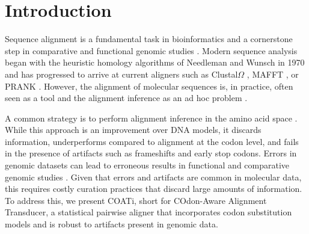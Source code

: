 \section{Introduction}

Sequence alignment is a fundamental task in bioinformatics and a cornerstone
step in comparative and functional genomic studies
\parencite{sequence_alignment_rosenberg_2009}.
Modern sequence analysis began with the heuristic homology algorithms of
Needleman and Wunsch in 1970 \parencite{identification_smith_1981} and has
progressed to arrive at current aligners such as Clustal$\Omega$
\parencite{clustal_omega_sievers_2011}, MAFFT \parencite{mafft_katoh_2002}, or
PRANK \parencite{prank_loytynoja_2014}.
However, the alignment of molecular sequences is, in practice, often seen as a
tool and the alignment inference as an ad hoc problem
\parencite{morrison_MSA_2018}.

A common strategy is to perform alignment inference in the amino acid space
\parencite{bininda2005transalign,abascal2010translatorx}.
While this approach is an improvement over DNA models, it discards information,
underperforms compared to alignment at the codon level, and fails in the
presence of artifacts such as frameshifts and early stop codons.
Errors in genomic datasets can lead to erroneous results in
functional and comparative genomic studies \parencite{estimates_schneider_2009}.
Given that errors and artifacts are common in molecular data, this requires
costly curation practices that discard large amounts of information.
To address this, we present COATi, short for COdon-Aware Alignment Transducer,
a statistical pairwise aligner that incorporates codon substitution models and
is robust to artifacts present in genomic data.
